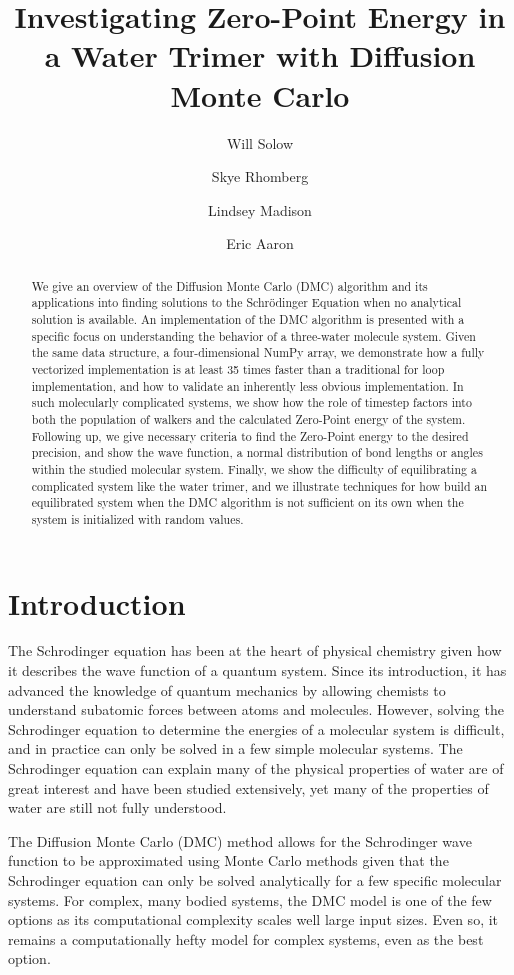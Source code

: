 \documentclass[journal=jacsat,manuscript=article]{achemso}
\author{Will Solow}
\author{Skye Rhomberg}
\author{Lindsey Madison}
\author{Eric Aaron}
\affiliation[Colby College]
{Department of Computer Science, Colby College, Waterville, ME}
\title{Investigating Zero-Point Energy in a Water Trimer with Diffusion Monte Carlo}
\begin{document}
\begin{abstract}
We give an overview of the Diffusion Monte Carlo (DMC) algorithm and its applications into finding solutions to the Schr\"odinger Equation when no analytical solution is available. An implementation of the DMC algorithm is presented with a specific focus on understanding the behavior of a three-water molecule system. Given the same data structure, a four-dimensional NumPy array, we demonstrate how a fully vectorized implementation is at least 35 times faster than a traditional for loop implementation, and how to validate an inherently less obvious implementation. In such molecularly complicated systems, we show how the role of timestep factors into both the population of walkers and the calculated Zero-Point energy of the system. Following up, we give necessary criteria to find the Zero-Point energy to the desired precision, and show the wave function, a normal distribution of bond lengths or angles within the studied molecular system. Finally, we show the difficulty of equilibrating a complicated system like the water trimer, and we illustrate techniques for how build an equilibrated system when the DMC algorithm is not sufficient on its own when the system is initialized with random values.
\end{abstract}


\section{Introduction}

The Schrodinger\cite{Schrodinger1926} equation has been at the heart of physical chemistry given how it describes the wave function of a quantum system. Since its introduction, it has advanced the knowledge of quantum mechanics by allowing chemists to understand subatomic forces between atoms and molecules. However, solving the Schrodinger equation to determine the energies of a molecular system is difficult, and in practice can only be solved in a few simple molecular systems. The Schrodinger equation can explain many of the physical properties of water are of great interest and have been studied extensively\cite{Goldman2004,Gillan2013}, yet many of the properties of water are still not fully understood.\cite{Liu1996}

The Diffusion Monte Carlo\cite{Anderson1975} (DMC) method allows for the Schrodinger wave function to be approximated using Monte Carlo methods given that the Schrodinger equation can only be solved analytically for a few specific molecular systems.\cite{Faber1996,Pang2014} For complex, many bodied systems\cite{Lee2019,Veil2001}, the DMC model is one of the few options as its computational complexity scales well large input sizes. Even so, it remains a computationally hefty model for complex systems, even as the best option. 
	
\end{document}
